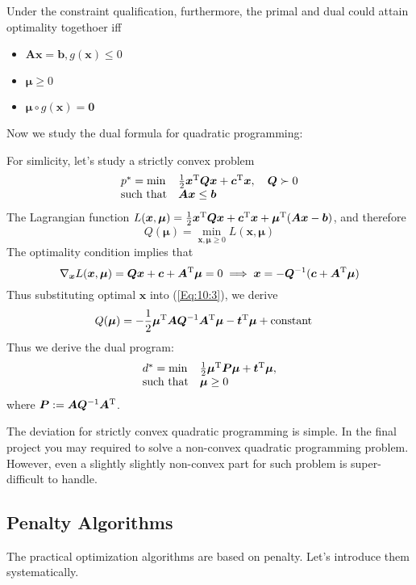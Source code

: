 Under the constraint qualification, furthermore, the primal and dual could attain optimality togethoer iff
\begin{itemize}
\item
$\bm{Ax}=\bm b,g(\bm x)\le0$
\item
$\bm\mu\ge0$
\item
$\bm\mu\circ g(\bm x)=\bm0$
\end{itemize}
Now we study the dual formula for quadratic programming:
\begin{example}
For simlicity, let's study a strictly convex problem
\begin{equation}
\begin{array}{ll}
p^*=\min&\frac{1}{2}\bm x^{\mathrm T}\bm Q\bm x+\bm c^{\mathrm T}\bm x,\quad\bm Q\succ0\\
\mbox{such that}&\bm{Ax}\le\bm b
\end{array}
\end{equation}
The Lagrangian function $L(\bm x,\bm\mu)=\frac{1}{2}\bm x^{\mathrm T}\bm Q\bm x+\bm c^{\mathrm T}\bm x+\bm\mu^{\mathrm T}(\bm{Ax}-\bm b)$, and therefore
\begin{equation}\label{Eq:10:3}
Q(\bm\mu)=\min_{\bm x,\bm\mu\ge0}L(\bm x,\bm\mu)
\end{equation}
The optimality condition implies that
\[
\nabla_{\bm x}L(\bm x,\bm\mu)=\bm{Qx}+\bm c+\bm A^{\mathrm T}\bm\mu=0\implies
\bm x=-\bm Q^{-1}(\bm c+\bm A^{\mathrm T}\bm\mu)
\]
Thus substituting optimal $\bm x$ into (\ref{Eq:10:3}), we derive
\begin{align*}
Q(\bm\mu)&=-\frac{1}{2}\bm\mu^{\mathrm T}\bm A\bm Q^{-1}\bm A^{\mathrm T}\bm\mu-\bm t^{\mathrm T}\bm\mu+\mbox{constant}
\end{align*}
Thus we derive the dual program:
\begin{equation}
\begin{array}{ll}
d^*=\min&\frac{1}{2}\bm\mu^{\mathrm T}\bm P\bm\mu+\bm t^{\mathrm T}\bm\mu,\\
\mbox{such that}&\bm\mu\ge0
\end{array}
\end{equation}
where $\bm P:=\bm A\bm Q^{-1}\bm A^{\mathrm T}$.
\end{example}
The deviation for strictly convex quadratic programming is simple. In the final project you may required to solve a non-convex quadratic programming problem. However, even a slightly slightly non-convex part for such problem is super-difficult to handle.
\subsection{Penalty Algorithms}
The practical optimization algorithms are based on penalty. Let's introduce them systematically.
